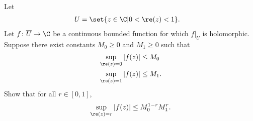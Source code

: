 \documentclass[10pt]{mypackage}
\begin{document}
\begin{problem}[Problem 3]
  Let 
  \begin{align*}
    U &= \set{z\in \C | 0 < \re(z) < 1}.
  \end{align*}
  Let $f\colon \overline{U}\rightarrow \C$ be a continuous bounded function for which $ f|_{U} $ is holomorphic. Suppose there exist constants $M_0\geq 0$ and $M_1\geq 0$ such that
  \begin{align*}
    \sup_{\re(z) = 0} \left\vert f(z) \right\vert &\leq M_0\\
    \sup_{\re(z) = 1} \left\vert f(z) \right\vert &\leq M_1.
  \end{align*}
  Show that for all $r\in [0,1]$,
  \begin{align*}
    \sup_{\re(z) = r} \left\vert f(z) \right\vert \leq M_0^{1-r}M_1^{r}.
  \end{align*}
\end{problem}
\end{document}
